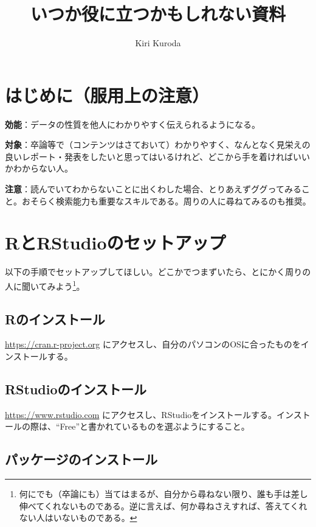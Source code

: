 \documentclass[]{book}
\title{いつか役に立つかもしれない資料}
\author{Kiri Kuroda}
\date{}
\let\rmarkdownfootnote\footnote%
\def\footnote{\protect\rmarkdownfootnote}
\begin{document}
\maketitle

{
\setcounter{tocdepth}{1}
\tableofcontents
}
\chapter*{はじめに（服用上の注意）}

\textbf{効能}：データの性質を他人にわかりやすく伝えられるようになる。

\textbf{対象}：卒論等で（コンテンツはさておいて）わかりやすく、なんとなく見栄えの良いレポート・発表をしたいと思ってはいるけれど、どこから手を着ければいいかわからない人。

\textbf{注意}：読んでいてわからないことに出くわした場合、とりあえずググってみること。おそらく検索能力も重要なスキルである。周りの人に尋ねてみるのも推奨。

\chapter*{RとRStudioのセットアップ}\label{rrstudio}

以下の手順でセットアップしてほしい。どこかでつまずいたら、とにかく周りの人に聞いてみよう\footnote{何にでも（卒論にも）当てはまるが、自分から尋ねない限り、誰も手は差し伸べてくれないものである。逆に言えば、何か尋ねさえすれば、答えてくれない人はいないものである。}。

\section{Rのインストール}\label{r}

\url{https://cran.r-project.org}
にアクセスし、自分のパソコンのOSに合ったものをインストールする。

\section{RStudioのインストール}\label{rstudio}

\url{https://www.rstudio.com}
にアクセスし、RStudioをインストールする。インストールの際は、``Free''と書かれているものを選ぶようにすること。

\section{パッケージのインストール}
\end{document}
